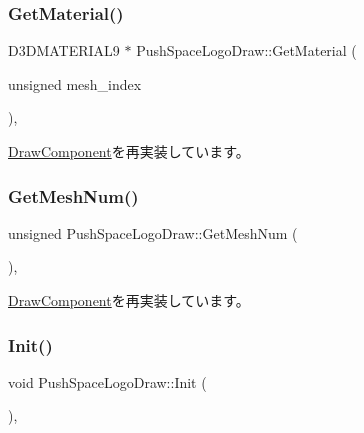 \subsubsection{\texorpdfstring{Get\+Material()}{GetMaterial()}}
{\footnotesize\ttfamily D3\+D\+M\+A\+T\+E\+R\+I\+A\+L9 $\ast$ Push\+Space\+Logo\+Draw\+::\+Get\+Material (\begin{DoxyParamCaption}\item[{unsigned}]{mesh\+\_\+index }\end{DoxyParamCaption})\hspace{0.3cm}{\ttfamily [override]}, {\ttfamily [virtual]}}



\mbox{\hyperlink{class_draw_component_adae078d5139f691997763bf6cac9e25a}{Draw\+Component}}を再実装しています。

\mbox{\label{class_push_space_logo_draw_ac6e2e4f3158976693efaa2c1f351050f}} 
\subsubsection{\texorpdfstring{Get\+Mesh\+Num()}{GetMeshNum()}}
{\footnotesize\ttfamily unsigned Push\+Space\+Logo\+Draw\+::\+Get\+Mesh\+Num (\begin{DoxyParamCaption}{ }\end{DoxyParamCaption})\hspace{0.3cm}{\ttfamily [override]}, {\ttfamily [virtual]}}



\mbox{\hyperlink{class_draw_component_a5f3bbcc8e563b740c0a5535170921c75}{Draw\+Component}}を再実装しています。

\mbox{\label{class_push_space_logo_draw_a7ad3fe53d9bda4ea16c958bc102ff54e}} 
\subsubsection{\texorpdfstring{Init()}{Init()}}
{\footnotesize\ttfamily void Push\+Space\+Logo\+Draw\+::\+Init (\begin{DoxyParamCaption}{ }\end{DoxyParamCaption})\hspace{0.3cm}{\ttfamily [override]}, {\ttfamily [virtual]}}



